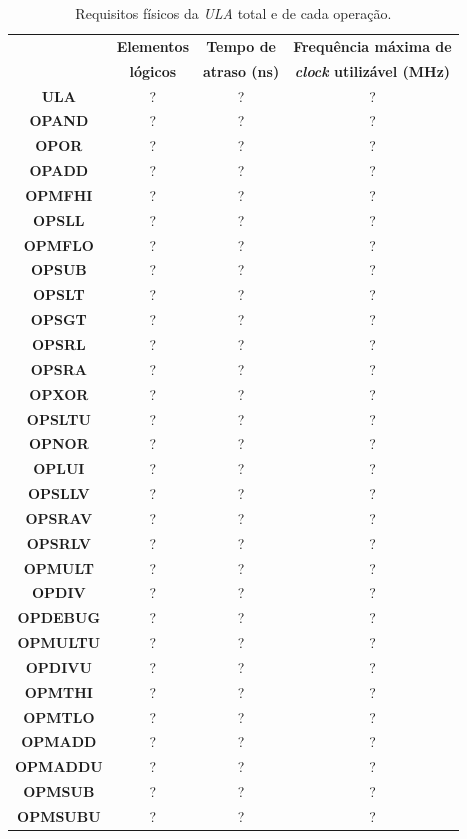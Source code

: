 \documentclass[12pt]{article}
\begin{document}
\begin{table}[H]
	\centering
	\begin{tabular}{|c|c|c|c|}
		\hline
		& \textbf{Elementos} & \textbf{Tempo de} & \textbf{Frequência máxima de} \\
		& \textbf{lógicos} & \textbf{atraso (ns)} & \textbf{\textit{clock} utilizável (MHz)} \\
		\hline
		\textbf{ULA} & ? & ? & ? \\\hline
		\textbf{OPAND} & ? & ? & ? \\\hline
		\textbf{OPOR} & ? & ? & ? \\\hline
		\textbf{OPADD} & ? & ? & ? \\\hline
		\textbf{OPMFHI} & ? & ? & ? \\\hline
		\textbf{OPSLL} & ? & ? & ? \\\hline
		\textbf{OPMFLO} & ? & ? & ? \\\hline
		\textbf{OPSUB} & ? & ? & ? \\\hline
		\textbf{OPSLT} & ? & ? & ? \\\hline
		\textbf{OPSGT} & ? & ? & ? \\\hline
		\textbf{OPSRL} & ? & ? & ? \\\hline
		\textbf{OPSRA} & ? & ? & ? \\\hline
		\textbf{OPXOR} & ? & ? & ? \\\hline
		\textbf{OPSLTU} & ? & ? & ? \\\hline
		\textbf{OPNOR} & ? & ? & ? \\\hline
		\textbf{OPLUI} & ? & ? & ? \\\hline
		\textbf{OPSLLV} & ? & ? & ? \\\hline
		\textbf{OPSRAV} & ? & ? & ? \\\hline
		\textbf{OPSRLV} & ? & ? & ? \\\hline
		\textbf{OPMULT} & ? & ? & ? \\\hline
		\textbf{OPDIV} & ? & ? & ? \\\hline
		\textbf{OPDEBUG} & ? & ? & ? \\\hline
		\textbf{OPMULTU} & ? & ? & ? \\\hline
		\textbf{OPDIVU} & ? & ? & ? \\\hline
		\textbf{OPMTHI} & ? & ? & ? \\\hline
		\textbf{OPMTLO} & ? & ? & ? \\\hline
		\textbf{OPMADD} & ? & ? & ? \\\hline
		\textbf{OPMADDU} & ? & ? & ? \\\hline
		\textbf{OPMSUB} & ? & ? & ? \\\hline
		\textbf{OPMSUBU}  & ? & ? & ? \\\hline
	\end{tabular}
	\caption{Requisitos físicos da \textit{ULA} total e de cada operação.}
	\label{tab:req2}
\end{table}
\end{document}

